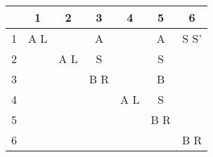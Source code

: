 \documentclass[12pt]{article}
\begin{document}
\begin{center}
  \begin{tabular}{ c || c | c | c | c | c | c | }
      &  1  &  2  &  3  &  4  &  5  &  6   \\ \hline \hline
    1 & A L &     &  A  &     &  A  & S S' \\ \hline
    2 &     & A L &  S  &     &  S  &      \\ \hline
    3 &     &     & B R &     &  B  &      \\ \hline
    4 &     &     &     & A L &  S  &      \\ \hline
    5 &     &     &     &     & B R &      \\ \hline
    6 &     &     &     &     &     & B R  \\ \hline
  \end{tabular}
  \end{center}
\end{document}
